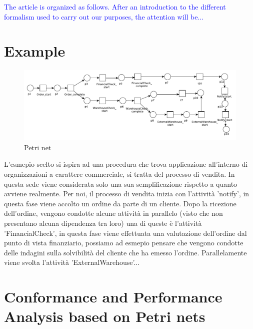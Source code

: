 \documentclass[11pt]{article}
\begin{document}
\textcolor{blue}{
The article is organized as follows. After an introduction to the different formalism used to carry out our purposes, the attention will be...
}

\section{Example}\label{example}
\begin{figure}[h]\label{ConfLog}
\includegraphics[width=360pt]
{./items/Sales_PN.pdf}
\caption{Petri net}
\end{figure}

L'esmepio scelto si ispira ad una procedura che trova applicazione all'interno di organizzazioni a carattere commerciale, si tratta del processo di vendita. In questa sede viene considerata solo una sua semplificazione rispetto a quanto avviene realmente. Per noi, il processo di vendita inizia con l'attività 'notify', in questa fase viene accolto un ordine da parte di un cliente. Dopo la ricezione dell'ordine, vengono condotte alcune attività in parallelo (visto che non presentano alcuna dipendenza tra loro) una di queste è l'attività 'FinancialCheck', in questa fase viene effettuata una valutazione dell'ordine dal punto di vista finanziario, possiamo ad esmepio pensare che vengono condotte delle indagini sulla solvibilità del cliente che ha emesso l'ordine. Parallelamente viene svolta l'attività 'ExternalWarehouse'...

\section{Conformance and Performance Analysis based on Petri nets}
\end{document}
